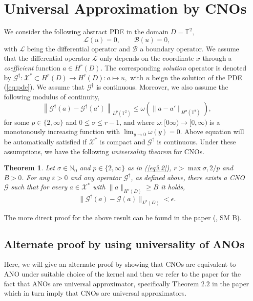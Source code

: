 \documentclass[reqno,10pt]{amsart}
\theoremstyle{plain}
\newtheorem{thm}{Theorem}
\theoremstyle{definition}
\newcommand{\bb}[1]{\mathbb{#1}}
\newcommand{\cal}[1]{\mathcal{#1}}
\begin{document}
    \section{Universal Approximation by CNOs}
    \noindent We consider the following abstract PDE in the domain $D = \bb T^2$,
    \begin{equation}\label{eq:pde}
        \cal L(u) = 0, \qquad \cal B(u) = 0,
    \end{equation}
    with $\cal L$ being the differential operator and $\cal B$ a boundary operator. We assume that the differential operator $\cal L$ only depends on the coordinate $x$ through a {\it coefficient} function $a \in H^r(D).$ The corresponding {\it solution} operator is denoted by $\cal G^\dag : \cal X^* \subset H^r(D) \to H^r(D) : a \mapsto u,$ with $u$ beign the solution of the PDE (\ref{eq:pde}). We assume that $\cal G^\dag$ is continuous. Moreover, we also assume the following modulus of continuity,
    \begin{equation}\label{eq3.2}
        \left\|\cal G^\dag(a) - \cal G^\dag(a')\right\|_{L^p(\bb T^2)} \leq \omega\left(\|a - a'\|_{H^\sigma(\bb T^2)}\right),
    \end{equation}
    for some $p \in \{2,\infty\}$ and $0 \leq \sigma \leq r-1$, and where $\omega : [0\infty) \to [0,\infty)$ is a monotonously increasing function with $\lim_{y \to 0} \omega (y) = 0$. Above equation will be automatically satisfied if $\cal X^*$ is compact and $\cal G^\dag$ is continuous. Under these assumptions, we have the following {\it universality theorem} for CNOs.

    \begin{thm}
        Let $\sigma \in \bb N_0$ and $p \in \{2,\infty\}$ as in (\ref{eq3.2}), $r > \max{\sigma, 2/p}$ and $B > 0$. For any $\varepsilon > 0$ and any operator $\cal G^\dag$, as defined above, there exists a CNO $\cal G$ such that for every $a \in \cal X^*$ with $\|a\|_{H^r(D)} \geq B$ it holds,
        \begin{equation}
            \|\cal G^\dag(a) - \cal G(a)\|_{L^p(D)} < \epsilon.
        \end{equation}
    \end{thm}
    \noindent The more direct proof for the above result can be found in the paper (\cite{BR2023}, SM B).
    
    \subsection{Alternate proof by using universality of ANOs}
    Here, we will give an alternate proof by showing that CNOs are equivalent to ANO under suitable choice of the kernel and then we refer to the paper \cite{SL2024} for the fact that ANOs are universal approximator, specifically Theorem $2.2$ in the paper \cite{SL2024} which in turn imply that CNOs are universal approximators.
\end{document}
